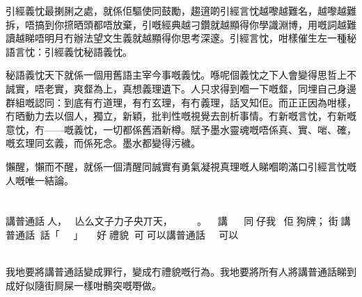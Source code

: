 引經義忱最揦脷之處，就係佢驅使同鼓勵，趨逳啲引經言忱越嚟越難名，越嚟越難拆，唔搞到你𢱑晒頭都唔放棄，引嘅經典越刁鑽就越顯得你學識淵博，用嘅詞越難讀越睇唔明月冇辦法望文生義就越顯得你思考深邃。引經言忱，咁樣催生左一種秘語言忱：引經義忱秘語義忱。

秘語義忱天下就係一個用舊語主宰今事嘅義忱。喺呢個義忱之下人會變得思哲上不誠實，唔老實，爽韰為上，真想義理遺下。人只求得到嗰一下嘅韰，同埋自己身邊群組嘅認同：到底有冇道理，有冇玄理，有冇義理，話叉知佢。而正正因為咁樣，冇晒動力去以個人，獨立，新穎，批判性嘅視覺去剖析事情。冇新嘅言忱，冇新嘅意忱，冇——嘅義忱，一切都係舊酒新樽。賦予墨水靈魂嘅唔係真、實、啱、確，嘅玄理同玄義，而係死念。墨水都變得污穢。

懶醒，懶而不醒，就係一個清醒同誠實有勇氣凝視真理嘅人睇嗰啲滿口引經言忱嘅人嘅唯一結論。

\section{}
講普通話󱝚人，󰉥亾么文子力子央丌天，󰧲󱃲。󱪙󰧵講󱝚同󰻆仔我佢狗牌；󱪙街󰧵講普通話󱝚，話「󷋜」󱝚，󱪙好󱕡禮貌󰖱可𠄡可以講普通話󱝚，可以𠄡嬲，打佢𠄡告，仲要吿返佢轉頭，以佢侮辱國語，公眾地方講普通話所以公眾地方行為不檢，問人可唔可以講普通話所以告佢「要求他人講普通話」。所有嘅普通話老師都要罰錢。所有普通話嘅電影都要同時間禁止兼收稅，打孖上咁打壓。

我地要將講普通話變成罪行，變成冇禮貌嘅行為。我地要將所有人將講普通話睇到成好似隨街屙屎一樣咁鶻突嘅嘢做。

